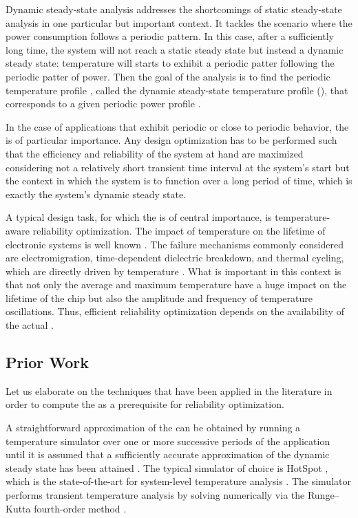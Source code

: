 Dynamic steady-state analysis addresses the shortcomings of static steady-state
analysis in one particular but important context. It tackles the scenario where
the power consumption follows a periodic pattern. In this case, after a
sufficiently long time, the system will not reach a static steady state but
instead a dynamic steady state: temperature will starts to exhibit a periodic
patter following the periodic patter of power. Then the goal of the analysis is
to find the periodic temperature profile \mq, called the dynamic steady-state
temperature profile (), that corresponds to a given periodic power
profile \mp.

In the case of applications that exhibit periodic or close to periodic behavior,
the  is of particular importance. Any design optimization has to be
performed such that the efficiency and reliability of the system at hand are
maximized considering not a relatively short transient time interval at the
system's start but the context in which the system is to function over a long
period of time, which is exactly the system's dynamic steady state.

A typical design task, for which the  is of central importance, is
temperature-aware reliability optimization. The impact of temperature on the
lifetime of electronic systems is well known \cite{srinivasan2004, coskun2006,
jedec2010, xiang2010}. The failure mechanisms commonly considered are
electromigration, time-dependent dielectric breakdown, and thermal cycling,
which are directly driven by temperature \cite{jedec2010}. What is important in
this context is that not only the average and maximum temperature have a huge
impact on the lifetime of the chip but also the amplitude and frequency of
temperature oscillations. Thus, efficient reliability optimization depends on
the availability of the actual .

\subsection{Prior Work}

Let us elaborate on the techniques that have been applied in the literature in
order to compute the  as a prerequisite for reliability optimization.

A straightforward approximation of the  can be obtained by running a
temperature simulator over one or more successive periods of the application
until it is assumed that a sufficiently accurate approximation of the dynamic
steady state has been attained \cite{srinivasan2004}. The typical simulator of
choice is HotSpot \cite{skadron2003}, which is the state-of-the-art for
system-level temperature analysis \cite{srinivasan2004, liao2005, coskun2006,
liu2007, huang2009, xiang2010, thiele2011}. The simulator performs transient
temperature analysis by solving  numerically
via the Runge--Kutta fourth-order method \cite{press2007}.

